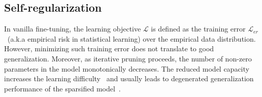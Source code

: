 
%
%	

\subsection{Self-regularization}
\label{sec:srr}
In vanilla fine-tuning, the learning objective $\mathcal{L}$ is defined as the training error $\mathcal{L}_{er}$~(a.k.a empirical risk in statistical learning) over the empirical data distribution.  However, minimizing such training error does not translate to good generalization. Moreover, as iterative pruning proceeds, the number of non-zero parameters in the model monotonically decreases. The reduced model capacity increases the learning difficulty~\cite{difficulty1,difficulty2} and usually leads to degenerated generalization performance of the sparsified model~\cite{movement}. 

